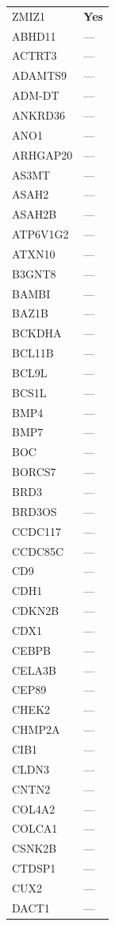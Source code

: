 \begin{longtable}{ll}
  ZMIZ1 & \textbf{Yes} \\
  ABHD11 & --- \\
  ACTRT3 & --- \\
  ADAMTS9 & --- \\
  ADM-DT & --- \\
  ANKRD36 & --- \\
  ANO1 & --- \\
  ARHGAP20 & --- \\
  AS3MT & --- \\
  ASAH2 & --- \\
  ASAH2B & --- \\
  ATP6V1G2 & --- \\
  ATXN10 & --- \\
  B3GNT8 & --- \\
  BAMBI & --- \\
  BAZ1B & --- \\
  BCKDHA & --- \\
  BCL11B & --- \\
  BCL9L & --- \\
  BCS1L & --- \\
  BMP4 & --- \\
  BMP7 & --- \\
  BOC & --- \\
  BORCS7 & --- \\
  BRD3 & --- \\
  BRD3OS & --- \\
  CCDC117 & --- \\
  CCDC85C & --- \\
  CD9 & --- \\
  CDH1 & --- \\
  CDKN2B & --- \\
  CDX1 & --- \\
  CEBPB & --- \\
  CELA3B & --- \\
  CEP89 & --- \\
  CHEK2 & --- \\
  CHMP2A & --- \\
  CIB1 & --- \\
  CLDN3 & --- \\
  CNTN2 & --- \\
  COL4A2 & --- \\
  COLCA1 & --- \\
  CSNK2B & --- \\
  CTDSP1 & --- \\
  CUX2 & --- \\
  DACT1 & --- \\

\end{longtable}
